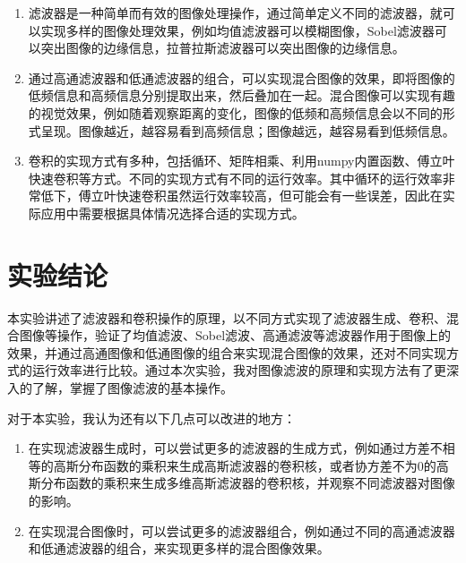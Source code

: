 \documentclass{article}
\begin{document}
\begin{enumerate}
    \item 滤波器是一种简单而有效的图像处理操作，通过简单定义不同的滤波器，就可以实现多样的图像处理效果，例如均值滤波器可以模糊图像，Sobel滤波器可以突出图像的边缘信息，拉普拉斯滤波器可以突出图像的边缘信息。
    \item 通过高通滤波器和低通滤波器的组合，可以实现混合图像的效果，即将图像的低频信息和高频信息分别提取出来，然后叠加在一起。混合图像可以实现有趣的视觉效果，例如随着观察距离的变化，图像的低频和高频信息会以不同的形式呈现。图像越近，越容易看到高频信息；图像越远，越容易看到低频信息。
    \item 卷积的实现方式有多种，包括循环、矩阵相乘、利用numpy内置函数、傅立叶快速卷积等方式。不同的实现方式有不同的运行效率。其中循环的运行效率非常低下，傅立叶快速卷积虽然运行效率较高，但可能会有一些误差，因此在实际应用中需要根据具体情况选择合适的实现方式。
\end{enumerate}

\section{实验结论}

本实验讲述了滤波器和卷积操作的原理，以不同方式实现了滤波器生成、卷积、混合图像等操作，验证了均值滤波、Sobel滤波、高通滤波等滤波器作用于图像上的效果，并通过高通图像和低通图像的组合来实现混合图像的效果，还对不同实现方式的运行效率进行比较。通过本次实验，我对图像滤波的原理和实现方法有了更深入的了解，掌握了图像滤波的基本操作。

对于本实验，我认为还有以下几点可以改进的地方：

\begin{enumerate}
    \item 在实现滤波器生成时，可以尝试更多的滤波器的生成方式，例如通过方差不相等的高斯分布函数的乘积来生成高斯滤波器的卷积核，或者协方差不为0的高斯分布函数的乘积来生成多维高斯滤波器的卷积核，并观察不同滤波器对图像的影响。
    \item 在实现混合图像时，可以尝试更多的滤波器组合，例如通过不同的高通滤波器和低通滤波器的组合，来实现更多样的混合图像效果。
\end{enumerate}


\end{document}
